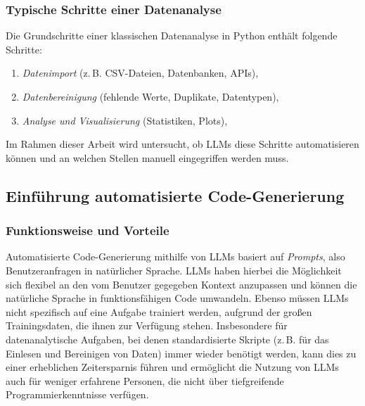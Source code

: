 \documentclass[11pt,a4paper]{article}
\begin{document}
\subsubsection{Typische Schritte einer Datenanalyse}
Die Grundschritte einer klassischen Datenanalyse in Python enthält folgende Schritte:
\begin{enumerate}
    \item \textit{Datenimport} (z.\,B. CSV-Dateien, Datenbanken, APIs),
    \item \textit{Datenbereinigung} (fehlende Werte, Duplikate, Datentypen),
    \item \textit{Analyse und Visualisierung} (Statistiken, Plots),
\end{enumerate}
Im Rahmen dieser Arbeit wird untersucht, ob LLMs diese Schritte automatisieren können und an welchen Stellen manuell eingegriffen werden muss.

\subsection{Einführung automatisierte Code-Generierung}
\label{sec:AutoCode}

\subsubsection{Funktionsweise und Vorteile}
Automatisierte Code-Generierung mithilfe von LLMs basiert auf \emph{Prompts}, also Benutzeranfragen in natürlicher Sprache. LLMs haben hierbei die Möglichkeit sich flexibel an den vom Benutzer gegegeben Kontext anzupassen und können die natürliche Sprache in funktionsfähigen Code umwandeln. Ebenso müssen LLMs nicht spezifisch auf eine Aufgabe trainiert werden, aufgrund der großen Trainingsdaten, die ihnen zur Verfügung stehen\cite{chen2021evaluatinglargelanguagemodels}. Insbesondere für datenanalytische Aufgaben, bei denen standardisierte Skripte (z.\,B. für das Einlesen und Bereinigen von Daten) immer wieder benötigt werden, kann dies zu einer erheblichen Zeitersparnis führen und ermöglicht die Nutzung von LLMs auch für weniger erfahrene Personen, die nicht über tiefgreifende Programmierkenntnisse verfügen.
\end{document}
